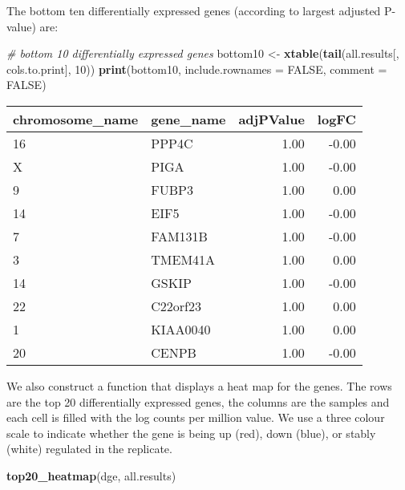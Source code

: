 \documentclass[]{article}
\newenvironment{Shaded}{\begin{snugshade}}{\end{snugshade}}
\newcommand{\KeywordTok}[1]{\textcolor[rgb]{0.13,0.29,0.53}{\textbf{{#1}}}}
\newcommand{\DataTypeTok}[1]{\textcolor[rgb]{0.13,0.29,0.53}{{#1}}}
\newcommand{\DecValTok}[1]{\textcolor[rgb]{0.00,0.00,0.81}{{#1}}}
\newcommand{\StringTok}[1]{\textcolor[rgb]{0.31,0.60,0.02}{{#1}}}
\newcommand{\CommentTok}[1]{\textcolor[rgb]{0.56,0.35,0.01}{\textit{{#1}}}}
\newcommand{\OtherTok}[1]{\textcolor[rgb]{0.56,0.35,0.01}{{#1}}}
\newcommand{\NormalTok}[1]{{#1}}
\begin{document}
The bottom ten differentially expressed genes (according to largest
adjusted P-value) are:

\begin{Shaded}
\begin{Highlighting}[]
\CommentTok{# bottom 10 differentially expressed genes}
\NormalTok{bottom10 <-}\StringTok{ }\KeywordTok{xtable}\NormalTok{(}\KeywordTok{tail}\NormalTok{(all.results[, cols.to.print], }\DecValTok{10}\NormalTok{))}
\KeywordTok{print}\NormalTok{(bottom10, }\DataTypeTok{include.rownames =} \OtherTok{FALSE}\NormalTok{, }\DataTypeTok{comment =} \OtherTok{FALSE}\NormalTok{)}
\end{Highlighting}
\end{Shaded}

\begin{table}[ht]
\centering
\begin{tabular}{llrr}
  \hline
chromosome\_name & gene\_name & adjPValue & logFC \\ 
  \hline
16 & PPP4C & 1.00 & -0.00 \\ 
  X & PIGA & 1.00 & -0.00 \\ 
  9 & FUBP3 & 1.00 & 0.00 \\ 
  14 & EIF5 & 1.00 & -0.00 \\ 
  7 & FAM131B & 1.00 & -0.00 \\ 
  3 & TMEM41A & 1.00 & 0.00 \\ 
  14 & GSKIP & 1.00 & -0.00 \\ 
  22 & C22orf23 & 1.00 & 0.00 \\ 
  1 & KIAA0040 & 1.00 & 0.00 \\ 
  20 & CENPB & 1.00 & -0.00 \\ 
   \hline
\end{tabular}
\end{table}

We also construct a function that displays a heat map for the genes. The
rows are the top 20 differentially expressed genes, the columns are the
samples and each cell is filled with the log counts per million value.
We use a three colour scale to indicate whether the gene is being up
(red), down (blue), or stably (white) regulated in the replicate.

\begin{Shaded}
\begin{Highlighting}[]
\KeywordTok{top20_heatmap}\NormalTok{(dge, all.results)}
\end{Highlighting}
\end{Shaded}
\end{document}
